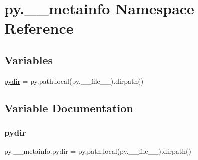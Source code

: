 \hypertarget{namespacepy_1_1____metainfo}{}\section{py.\+\_\+\+\_\+metainfo Namespace Reference}
\label{namespacepy_1_1____metainfo}
\subsection*{Variables}
\begin{DoxyCompactItemize}
\item 
\hyperlink{namespacepy_1_1____metainfo_a9ec943991b24595ce8d60f2ce99f0cba}{pydir} = py.\+path.\+local(py.\+\_\+\+\_\+file\+\_\+\+\_\+).dirpath()
\end{DoxyCompactItemize}


\subsection{Variable Documentation}
\mbox{\label{namespacepy_1_1____metainfo_a9ec943991b24595ce8d60f2ce99f0cba}} 
\subsubsection{\texorpdfstring{pydir}{pydir}}
{\footnotesize\ttfamily py.\+\_\+\+\_\+metainfo.\+pydir = py.\+path.\+local(py.\+\_\+\+\_\+file\+\_\+\+\_\+).dirpath()}

